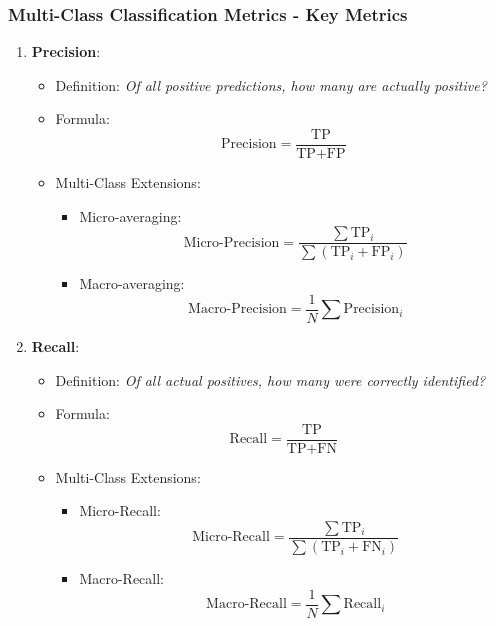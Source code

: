 \documentclass{beamer}
\begin{document}
\begin{frame}[fragile]
    \frametitle{Multi-Class Classification Metrics - Key Metrics}
    \begin{enumerate}
        \item \textbf{Precision}:
        \begin{itemize}
            \item Definition: \textit{Of all positive predictions, how many are actually positive?}
            \item Formula:
            \begin{equation} 
                \text{Precision} = \frac{\text{TP}}{\text{TP} + \text{FP}} 
            \end{equation}
            \item Multi-Class Extensions:
            \begin{itemize}
                \item Micro-averaging:
                \begin{equation} 
                    \text{Micro-Precision} = \frac{\sum \text{TP}_i}{\sum (\text{TP}_i + \text{FP}_i)} 
                \end{equation}
                \item Macro-averaging:
                \begin{equation} 
                    \text{Macro-Precision} = \frac{1}{N} \sum \text{Precision}_i 
                \end{equation}
            \end{itemize}
        \end{itemize}
        
        \item \textbf{Recall}:
        \begin{itemize}
            \item Definition: \textit{Of all actual positives, how many were correctly identified?}
            \item Formula:
            \begin{equation} 
                \text{Recall} = \frac{\text{TP}}{\text{TP} + \text{FN}} 
            \end{equation}
            \item Multi-Class Extensions:
            \begin{itemize}
                \item Micro-Recall:
                \begin{equation} 
                    \text{Micro-Recall} = \frac{\sum \text{TP}_i}{\sum (\text{TP}_i + \text{FN}_i)} 
                \end{equation}
                \item Macro-Recall:
                \begin{equation} 
                    \text{Macro-Recall} = \frac{1}{N} \sum \text{Recall}_i 
                \end{equation}
            \end{itemize}
        \end{itemize}
    \end{enumerate}
\end{frame}
\end{document}
